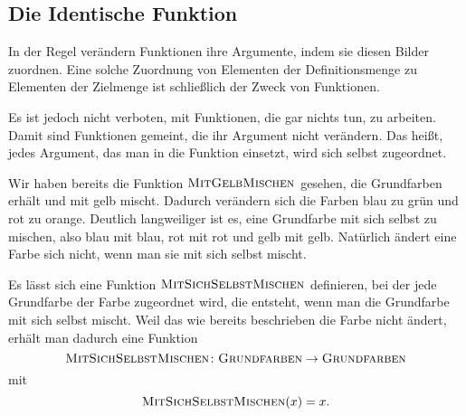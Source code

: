 \documentclass[../../main.tex]{subfiles}
\begin{document}
\subsection{Die Identische Funktion}
\label{sec:abbildungen_identitaet}

In der Regel verändern Funktionen ihre Argumente, indem sie diesen Bilder zuordnen. Eine solche Zuordnung von Elementen der Definitionsmenge zu Elementen der Zielmenge ist schließlich der Zweck von Funktionen. 

Es ist jedoch nicht verboten, mit Funktionen, die gar nichts tun, zu arbeiten. Damit sind Funktionen gemeint, die ihr Argument nicht verändern. Das heißt, jedes Argument, das man in die Funktion einsetzt, wird sich selbst zugeordnet.

\begin{example}{}
    Wir haben bereits die Funktion $\textsc{MitGelbMischen}$ gesehen, die Grundfarben erhält und mit gelb mischt. Dadurch verändern sich die Farben blau zu grün und rot zu orange. Deutlich langweiliger ist es, eine Grundfarbe mit sich selbst zu mischen, also blau mit blau, rot mit rot und gelb mit gelb. Natürlich ändert eine Farbe sich nicht, wenn man sie mit sich selbst mischt.
    
    Es lässt sich eine Funktion $\textsc{MitSichSelbstMischen}$ definieren, bei der jede Grundfarbe der Farbe zugeordnet wird, die entsteht, wenn man die Grundfarbe mit sich selbst mischt. Weil das wie bereits beschrieben die Farbe nicht ändert, erhält man dadurch eine Funktion
    \[\textsc{MitSichSelbstMischen}\colon\textsc{Grundfarben}\rightarrow\textsc{Grundfarben}\]
    mit
    \[\textsc{MitSichSelbstMischen}(x)=x.\]
\end{example}
\end{document}
